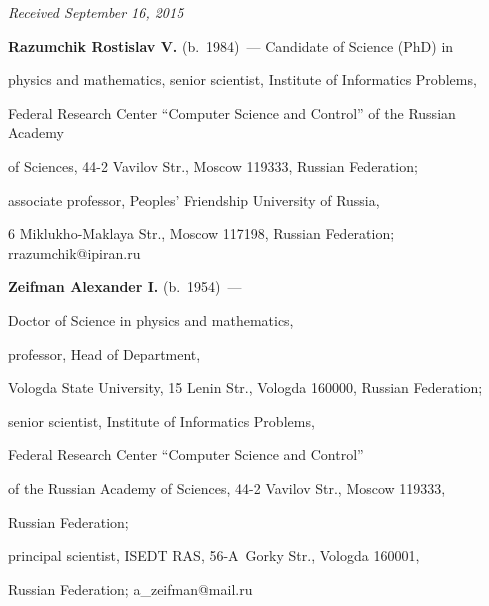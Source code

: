 




\vspace*{-1pt}



\hfill{\small\textit{Received September 16, 2015}}

   

 

\Contr



\noindent

\textbf{Razumchik Rostislav V.} (b.\ 1984)~--- Candidate of Science (PhD) in 

physics and mathematics, senior scientist, Institute of Informatics Problems, 

Federal Research Center ``Computer Science and Control'' of the Russian Academy 

of Sciences, 44-2 Vavilov Str., Moscow 119333, Russian Federation; 

associate professor, Peoples' Friendship University of Russia, 

6 Miklukho-Maklaya Str., Moscow 117198, Russian Federation; rrazumchik@ipiran.ru 



\vspace*{3pt}



\noindent

\textbf{Zeifman Alexander I.} (b.\ 1954)~---

Doctor of Science in physics and mathematics, 

professor, Head of Department, 

Vologda State University, 15 Lenin Str., Vologda 160000, Russian Federation; 

senior scientist, Institute of Informatics Problems, 

Federal Research Center ``Computer Science and Control'' 

of the Russian Academy of Sciences, 44-2 Vavilov Str., Moscow 119333, 

Russian Federation;  

principal scientist,  ISEDT RAS, 56-A~Gorky Str., Vologda 160001, 

Russian Federation; a\_zeifman@mail.ru



\vspace*{3pt}



\noindent

